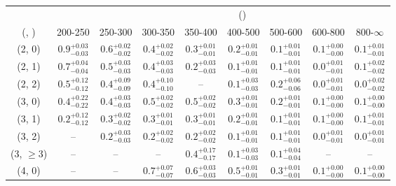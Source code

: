 \begin{table}[h!]
\tiny
\centering
{}
\begin{tabular}
{ccccccccc}
	\hline\hline
&	& \multicolumn{8}{c}{\scalht (\gev)} \\ 
	 (\njet,  \nb) & 200-250 & 250-300 & 300-350 & 350-400 & 400-500 & 500-600 & 600-800 & 800-$\infty$ \\ [0.8ex] 
\hline
	(2, 0) & $0.9^{+ 0.03 }_{- 0.03 }$ & $0.6^{+ 0.02 }_{- 0.02 }$ & $0.4^{+ 0.02 }_{- 0.02 }$ & $0.3^{+ 0.01 }_{- 0.01 }$ & $0.2^{+ 0.01 }_{- 0.01 }$ & $0.1^{+ 0.01 }_{- 0.01 }$ & $0.1^{+ 0.00 }_{- 0.00 }$ & $0.1^{+ 0.01 }_{- 0.01 }$ \\[0.5ex] 
	(2, 1) & $0.7^{+ 0.04 }_{- 0.04 }$ & $0.5^{+ 0.03 }_{- 0.03 }$ & $0.4^{+ 0.03 }_{- 0.03 }$ & $0.2^{+ 0.03 }_{- 0.03 }$ & $0.1^{+ 0.01 }_{- 0.01 }$ & $0.1^{+ 0.01 }_{- 0.01 }$ & $0.0^{+ 0.01 }_{- 0.01 }$ & $0.1^{+ 0.02 }_{- 0.02 }$ \\[0.5ex] 
	(2, 2) & $0.5^{+ 0.12 }_{- 0.12 }$ & $0.4^{+ 0.09 }_{- 0.09 }$ & $0.4^{+ 0.10 }_{- 0.10 }$ & -- & $0.1^{+ 0.03 }_{- 0.03 }$ & $0.2^{+ 0.06 }_{- 0.06 }$ & $0.0^{+ 0.01 }_{- 0.01 }$ & $0.0^{+ 0.02 }_{- 0.02 }$ \\[0.5ex] 
	(3, 0) & $0.4^{+ 0.22 }_{- 0.22 }$ & $0.4^{+ 0.03 }_{- 0.03 }$ & $0.5^{+ 0.02 }_{- 0.02 }$ & $0.5^{+ 0.02 }_{- 0.02 }$ & $0.3^{+ 0.01 }_{- 0.01 }$ & $0.2^{+ 0.01 }_{- 0.01 }$ & $0.1^{+ 0.00 }_{- 0.00 }$ & $0.1^{+ 0.00 }_{- 0.00 }$ \\[0.5ex] 
	(3, 1) & $0.2^{+ 0.12 }_{- 0.12 }$ & $0.3^{+ 0.02 }_{- 0.02 }$ & $0.3^{+ 0.01 }_{- 0.01 }$ & $0.3^{+ 0.01 }_{- 0.01 }$ & $0.2^{+ 0.01 }_{- 0.01 }$ & $0.1^{+ 0.01 }_{- 0.01 }$ & $0.1^{+ 0.00 }_{- 0.00 }$ & $0.1^{+ 0.01 }_{- 0.01 }$ \\[0.5ex] 
	(3, 2) & -- & $0.2^{+ 0.03 }_{- 0.03 }$ & $0.2^{+ 0.02 }_{- 0.02 }$ & $0.2^{+ 0.02 }_{- 0.02 }$ & $0.1^{+ 0.01 }_{- 0.01 }$ & $0.1^{+ 0.01 }_{- 0.01 }$ & $0.0^{+ 0.01 }_{- 0.01 }$ & $0.0^{+ 0.01 }_{- 0.01 }$ \\[0.5ex] 
	(3, $\ge3$) & -- & -- & -- & $0.4^{+ 0.17 }_{- 0.17 }$ & $0.1^{+ 0.03 }_{- 0.03 }$ & $0.1^{+ 0.04 }_{- 0.04 }$ & -- & -- \\[0.5ex] 
	(4, 0) & -- & -- & $0.7^{+ 0.07 }_{- 0.07 }$ & $0.6^{+ 0.03 }_{- 0.03 }$ & $0.5^{+ 0.01 }_{- 0.01 }$ & $0.3^{+ 0.01 }_{- 0.01 }$ & $0.1^{+ 0.00 }_{- 0.00 }$ & $0.1^{+ 0.00 }_{- 0.00 }$ \\[0.5ex] 

\end{tabular}
\end{table}
